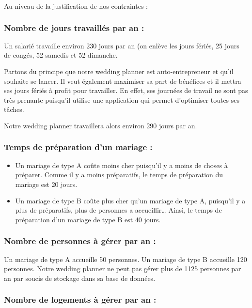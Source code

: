 \documentclass[
]{article}
\providecommand{\tightlist}{%
  \setlength{\itemsep}{0pt}\setlength{\parskip}{0pt}}
\begin{document}
\n

Au niveau de la justification de nos contraintes :

\subsubsection{Nombre de jours travaillés par an
:}\label{nombre-de-jours-travailluxe9s-par-an}

Un salarié travaille environ 230 jours par an (on enlève les jours
fériés, 25 jours de congés, 52 samedis et 52 dimanche.

Partons du principe que notre wedding planner est auto-entrepreneur et
qu'il souhaite se lancer. Il veut également maximiser sa part de
bénéfices et il mettra ses jours fériés à profit pour travailler. En
effet, ses journées de travail ne sont pas très prenante puisqu'il
utilise une application qui permet d'optimiser toutes ses tâches.

Notre wedding planner travaillera alors environ 290 jours par an.

\subsubsection{Temps de préparation d'un mariage
:}\label{temps-de-pruxe9paration-dun-mariage}

\begin{itemize}
\tightlist
\item
  Un mariage de type A coûte moins cher puisqu'il y a moins de choses à
  préparer. Comme il y a moins préparatifs, le temps de préparation du
  mariage est 20 jours.
\item
  Un mariage de type B coûte plus cher qu'un mariage de type A,
  puisqu'il y a plus de préparatifs, plus de personnes a
  accueillir\ldots{} Ainsi, le temps de préparation d'un mariage de type
  B est 40 jours.
\end{itemize}

\subsubsection{Nombre de personnes à gérer par an
:}\label{nombre-de-personnes-uxe0-guxe9rer-par-an}

Un mariage de type A accueille 50 personnes. Un mariage de type B
accueille 120 personnes. Notre wedding planner ne peut pas gérer plus de
1125 personnes par an par soucis de stockage dans sa base de données.

\subsubsection{Nombre de logements à gérer par an
:}\label{nombre-de-logements-uxe0-guxe9rer-par-an}
\end{document}
